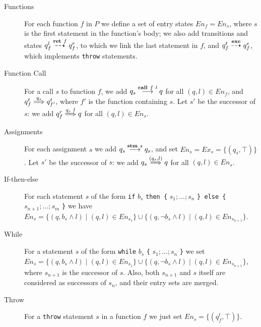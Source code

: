 \documentclass[9pt,a4paper]{article}
\begin{document}
\begin{description}
\item[Functions]
For each function $f$ in $P$ we define a set of entry states $\mathit{En}_f = \mathit{En}_s$, where $s$ is the first statement in the function's body; we also add transitions and states $q^l_f \stackrel{\mathbf{ret} \ f}{\dashrightarrow} q^r_f$, to which we link the last statement in $f$,
and $q^t_f \stackrel{\mathbf{exc}}{\dashrightarrow} q^e_f$, which implements \texttt{throw} statements.

\item[Function Call]
For a call $s$ to function $f$, we add $q_s \stackrel{\mathbf{call} \ f \ l}{\longrightarrow} q$ for all $(q, l) \in \mathit{En}_f$, and $q^t_f \stackrel{q_s}{\Longrightarrow} q^t_{f'}$, where $f'$ is the function containing $s$.
Let $s'$ be the successor of $s$: we add $q^r_f \stackrel{q_s \ l}{\Longrightarrow} q$ for all $(q, l) \in \mathit{En}_s$.

\item[Assignments]
For each assignment $s$ we add $q_s \stackrel{\mathbf{stm} \ s}{\longrightarrow}{q_s}$, and set $\mathit{En}_s = \mathit{Ex}_s = \{(q_s, \top)\}$. Let $s'$ be the successor of $s$: we add $q_s \stackrel{(q_s, l)}{\Longrightarrow} q$ for all $(q, l) \in \mathit{En}_s$.

\item[If-then-else]
For each statement $s$ of the form \texttt{if} $b_s$ \texttt{then \{} $s_1; \dots; s_n$ \texttt{\} else \{} $s_{n+1}; \dots; s_m$ \texttt{\}}
we have $\mathit{En}_s = \{(q, b_s \land l) \mid (q, l) \in \mathit{En}_{s_1}\} \cup \{(q, \neg b_s \land l) \mid (q, l) \in \mathit{En}_{s_{n+1}}\}$.

\item[While]
For a statement $s$ of the form \texttt{while} $b_s$ \texttt{\{} $s_1; \dots; s_n$ \texttt{\}} we set $\mathit{En}_s = \{(q, b_s \land l) \mid (q, l) \in \mathit{En}_{s_1}\} \cup \{(q, \neg b_s \land l) \mid (q, l) \in \mathit{En}_{s_{n+1}}\}$, where $s_{n+1}$ is the successor of $s$.
Also, both $s_{n+1}$ and $s$ itself are considered as successors of $s_n$, and their entry sets are merged.

\item[Throw]
For a \texttt{throw} statement $s$ in a function $f$ we just set $\mathit{En}_s = \{(q^t_f, \top)\}$.


\end{description}
\end{document}
